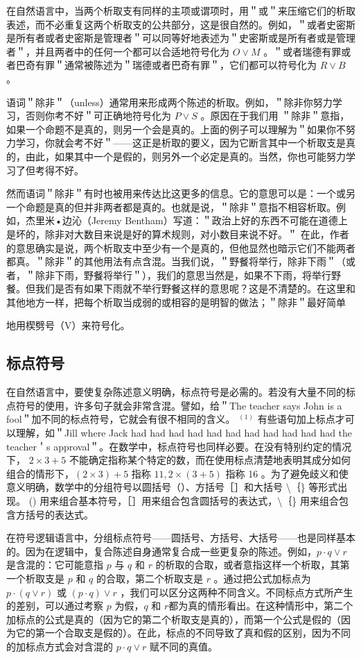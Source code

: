 在自然语言中，当两个析取支有同样的主项或谓项时，用＂或＂来压缩它们的析取表述，而不必重复这两个析取支的公共部分，这是很自然的。例如，＂或者史密斯是所有者或者史密斯是管理者＂可以同等好地表述为＂史密斯或是所有者或是管理者＂，并且两者中的任何一个都可以合适地符号化为 $O \vee M$ 。＂或者瑞德有罪或者巴奇有罪＂通常被陈述为＂瑞德或者巴奇有罪＂，它们都可以符号化为 $R \vee B$ 。

语词＂除非＂（unless）通常用来形成两个陈述的析取。例如，＂除非你努力学习，否则你考不好＂可正确地符号化为 $P \vee S$ 。原因在于我们用 ＂除非＂意指，如果一个命题不是真的，则另一个会是真的。上面的例子可以理解为＂如果你不努力学习，你就会考不好＂——这正是析取的要义，因为它断言其中一个析取支是真的，由此，如果其中一个是假的，则另外一个必定是真的。当然，你也可能努力学习了但考得不好。

然而语词＂除非＂有时也被用来传达比这更多的信息。它的意思可以是：一个或另一个命题是真的但并非两者都是真的。也就是说，＂除非＂意指不相容析取。例如，杰里米•边沁（Jeremy Bentham）写道：＂政治上好的东西不可能在道德上是坏的，除非对大数目来说是好的算术规则，对小数目来说不好。＂\cite{hume1748} 在此，作者的意思确实是说，两个析取支中至少有一个是真的，但他显然也暗示它们不能两者都真。＂除非＂的其他用法有点含混。当我们说，＂野餐将举行，除非下雨＂（或者，＂除非下雨，野餐将举行＂），我们的意思当然是，如果不下雨，将举行野餐。但我们是否有如果下雨就不举行野餐这样的意思呢？这是不清楚的。在这里和其他地方一样，把每个析取当成弱的或相容的是明智的做法；＂除非＂最好简单

地用楔劈号（V）来符号化。

\subsection{标点符号}
在自然语言中，要使复杂陈述意义明确，标点符号是必需的。若没有大量不同的标点符号的使用，许多句子就会非常含混。譬如，给＂The teacher says John is a fool＂加不同的标点符号，它就会有很不相同的含义。 ${ }^{(1)}$ 有些语句加上标点才可以理解，如＂Jill where Jack had had had had had had had had had had had the teacher＇s approval＂。在数学中，标点符号也同样必要。在没有特别约定的情况下， $2 \times 3+5$ 不能确定指称某个特定的数，而在使用标点清楚地表明其成分如何组合的情形下，$(2 \times 3)+5$ 指称 $11,2 \times(3+5)$ 指称 16 。为了避免歧义和使意义明确，数学中的分组符号以圆括号（）、方括号［］和大括号 \textbackslash ｛\} 等形式出现。 () 用来组合基本符号，［］用来组合包含圆括号的表达式，\textbackslash ｛\} 用来组合包含方括号的表达式。

在符号逻辑语言中，分组标点符号——圆括号、方括号、大括号——也是同样基本的。因为在逻辑中，复合陈述自身通常复合成一些更复杂的陈述。例如，$p \cdot q \vee r$ 是含混的：它可能意指 $p$ 与 $q$ 和 $r$ 的析取的合取，或者意指这样一个析取，其第一个析取支是 $p$ 和 $q$ 的合取，第二个析取支是 $r$ 。通过把公式加标点为 $p \cdot(q \vee r)$ 或 $(p \cdot q) \vee r$ ，我们可以区分这两种不同含义。不同标点方式所产生的差别，可以通过考察 $p$ 为假，$q$ 和 $r$都为真的情形看出。在这种情形中，第二个加标点的公式是真的（因为它的第二个析取支是真的），而第一个公式是假的（因为它的第一个合取支是假的）。在此，标点的不同导致了真和假的区别，因为不同的加标点方式会对含混的 $p \cdot q \vee r$ 赋不同的真值。


